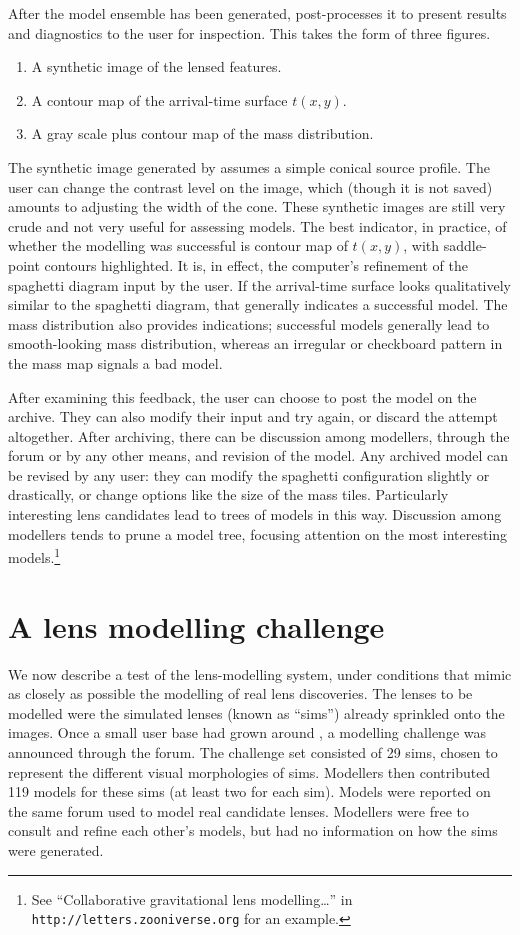 After the model ensemble has been generated, \spl post-processes it to
present results and diagnostics to the user for inspection. This takes
the form of three figures.
\begin{enumerate}
\item A synthetic image of the lensed features.
\item A contour map of the arrival-time surface $t(x,y)$.
\item A gray scale plus contour map of the mass distribution.
\end{enumerate}
The synthetic image generated by \spl assumes a simple conical source
profile.  The user can change the contrast level on the image, which
(though it is not saved) amounts to adjusting the width of the cone.
These synthetic images are still very crude and not very useful for
assessing models.  The best indicator, in practice, of whether the
modelling was successful is contour map of $t(x,y)$, with saddle-point
contours highlighted.  It is, in effect, the computer's refinement of
the spaghetti diagram input by the user.  If the arrival-time surface
looks qualitatively similar to the spaghetti diagram, that generally
indicates a successful model.  The mass distribution also provides
indications; successful models generally lead to smooth-looking mass
distribution, whereas an irregular or checkboard pattern in the mass
map signals a bad model.

After examining this feedback, the user can choose to post the model
on the \spl archive.  They can also modify their input and try again,
or discard the attempt altogether.  After archiving, there can be
discussion among modellers, through the \sw forum or by any other
means, and revision of the model.  Any archived model can be revised
by any user: they can modify the spaghetti configuration slightly or
drastically, or change options like the size of the mass tiles.
Particularly interesting lens candidates lead to trees of models in
this way.  Discussion among modellers tends to prune a model tree,
focusing attention on the most interesting models.\footnote{See
  ``Collaborative gravitational lens modelling\dots'' in {\tt
    http://letters.zooniverse.org} for an example.}

\section{A lens modelling challenge} \label{sec:mod_challenge}

We now describe a test of the lens-modelling system, under conditions
that mimic as closely as possible the modelling of real lens
discoveries.  The lenses to be modelled were the simulated lenses
(known as ``sims'') already sprinkled onto the \sw images.  Once a
small user base had grown around \spl, a modelling challenge was
announced through the \sw forum.  The challenge set consisted of 29
sims, chosen to represent the different visual morphologies of \sw
sims. Modellers then contributed 119 models for these sims (at least
two for each sim).  Models were reported on the same forum used to
model real candidate lenses.  Modellers were free to consult and
refine each other's models, but had no information on how the sims
were generated.

